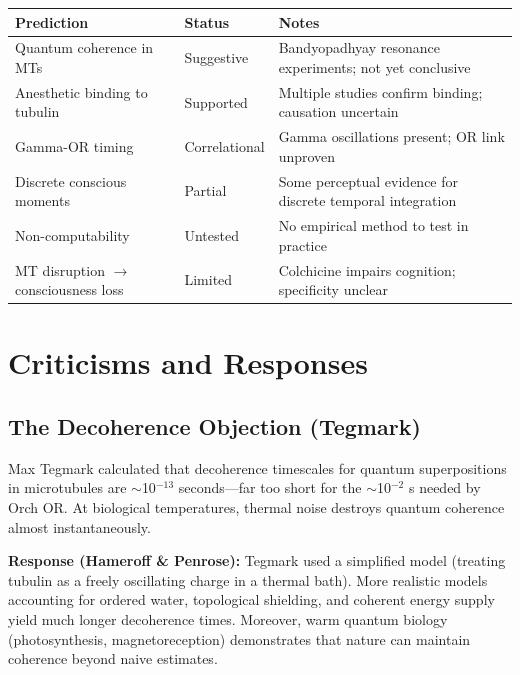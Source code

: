 \documentclass[11pt,a4paper]{report}
\begin{document}
\begin{center}
\renewcommand{\arraystretch}{1.3}
\begin{tabular}{>{\raggedright}p{4cm} >{\raggedright}p{2cm} >{\raggedright\arraybackslash}p{7cm}}
  \toprule
  \textbf{Prediction} & \textbf{Status} & \textbf{Notes} \\
  \midrule
  Quantum coherence in MTs & Suggestive & Bandyopadhyay resonance experiments; not yet conclusive \\
  Anesthetic binding to tubulin & Supported & Multiple studies confirm binding; causation uncertain \\
  Gamma-OR timing & Correlational & Gamma oscillations present; OR link unproven \\
  Discrete conscious moments & Partial & Some perceptual evidence for discrete temporal integration \\
  Non-computability & Untested & No empirical method to test in practice \\
  MT disruption $\to$ consciousness loss & Limited & Colchicine impairs cognition; specificity unclear \\
  \bottomrule
\end{tabular}
\end{center}


\chapter{Criticisms and Responses}

\section{The Decoherence Objection (Tegmark)}

\begin{objbox}
Max Tegmark calculated that decoherence timescales for quantum superpositions in microtubules are $\sim$10$^{-13}$ seconds---far too short for the $\sim$10$^{-2}$ s needed by Orch OR. At biological temperatures, thermal noise destroys quantum coherence almost instantaneously.
\end{objbox}

\textbf{Response (Hameroff \& Penrose):} Tegmark used a simplified model (treating tubulin as a freely oscillating charge in a thermal bath). More realistic models accounting for ordered water, topological shielding, and coherent energy supply yield much longer decoherence times. Moreover, warm quantum biology (photosynthesis, magnetoreception) demonstrates that nature can maintain coherence beyond naive estimates.
\end{document}
